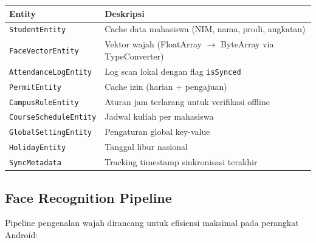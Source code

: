 \documentclass[12pt,a4paper]{article}
\begin{document}
\begin{table}[H]
  \centering
  \begin{tabularx}{\textwidth}{lX}
    \toprule
    \textbf{Entity} & \textbf{Deskripsi} \\
    \midrule
    \texttt{StudentEntity} & Cache data mahasiswa (NIM, nama, prodi, angkatan) \\
    \texttt{FaceVectorEntity} & Vektor wajah (FloatArray $\rightarrow$ ByteArray via TypeConverter) \\
    \texttt{AttendanceLogEntity} & Log scan lokal dengan flag \texttt{isSynced} \\
    \texttt{PermitEntity} & Cache izin (harian + pengajuan) \\
    \texttt{CampusRuleEntity} & Aturan jam terlarang untuk verifikasi offline \\
    \texttt{CourseScheduleEntity} & Jadwal kuliah per mahasiswa \\
    \texttt{GlobalSettingEntity} & Pengaturan global key-value \\
    \texttt{HolidayEntity} & Tanggal libur nasional \\
    \texttt{SyncMetadata} & Tracking timestamp sinkronisasi terakhir \\
    \bottomrule
  \end{tabularx}
\end{table}

\subsection{Face Recognition Pipeline}

Pipeline pengenalan wajah dirancang untuk efisiensi maksimal pada perangkat Android:
\end{document}
